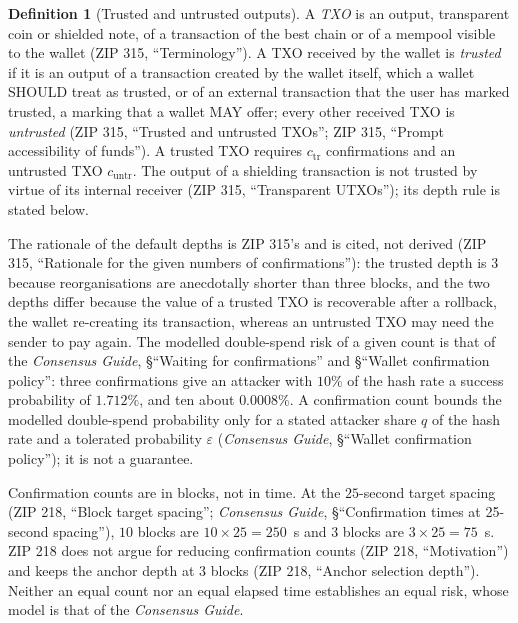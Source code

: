 \documentclass[11pt,a4paper]{article}
\theoremstyle{definition}
\newtheorem{definition}[theorem]{Definition}
\begin{document}
\begin{definition}[Trusted and untrusted outputs]\label{def:spend-trust}
A \emph{TXO} is an output, transparent coin or shielded note, of a
transaction of the best chain or of a mempool visible to the wallet (ZIP
315, ``Terminology''). A TXO received by the wallet is \emph{trusted} if it
is an output of a transaction created by the wallet itself, which a wallet
SHOULD treat as trusted, or of an external transaction that the user has
marked trusted, a marking that a wallet MAY offer; every other received TXO
is \emph{untrusted} (ZIP 315, ``Trusted and untrusted TXOs''; ZIP 315,
``Prompt accessibility of funds''). A trusted TXO requires
$c_{\mathrm{tr}}$ confirmations and an untrusted TXO $c_{\mathrm{untr}}$.
The output of a shielding transaction is not trusted by virtue of its
internal receiver (ZIP 315, ``Transparent UTXOs''); its depth rule is
stated below.
\end{definition}

The rationale of the default depths is ZIP 315's and is cited, not derived
(ZIP 315, ``Rationale for the given numbers of confirmations''): the trusted
depth is $3$ because reorganisations are anecdotally shorter than three
blocks, and the two depths differ because the value of a trusted TXO is
recoverable after a rollback, the wallet re-creating its transaction,
whereas an untrusted TXO may need the sender to pay again. The modelled
double-spend risk of a given count is that of the \emph{Consensus Guide},
\S``Waiting for confirmations'' and \S``Wallet confirmation policy'': three
confirmations give an attacker with $10\%$ of the hash rate a success
probability of $1.712\%$, and ten about $0.0008\%$. A confirmation count bounds
the modelled double-spend probability only for a stated attacker share $q$
of the hash rate and a tolerated probability $\varepsilon$ (\emph{Consensus
Guide}, \S``Wallet confirmation policy''); it is not a guarantee.

Confirmation counts are in blocks, not in time. At the $25$-second target
spacing (ZIP 218, ``Block target spacing''; \emph{Consensus Guide},
\S``Confirmation times at 25-second spacing''), $10$ blocks are $10 \times 25 = 250$~s
and $3$ blocks are $3 \times 25 = 75$~s. ZIP 218 does not argue for reducing
confirmation counts (ZIP 218, ``Motivation'') and keeps the anchor depth at
$3$ blocks (ZIP 218, ``Anchor selection depth''). Neither an equal count nor
an equal elapsed time establishes an equal risk, whose model is that of the
\emph{Consensus Guide}.
\end{document}
